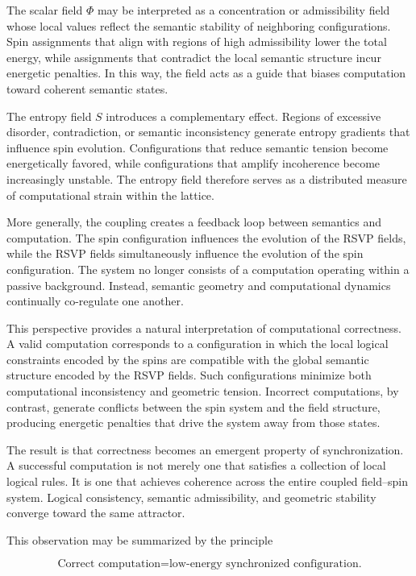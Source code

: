 \documentclass[12pt,letterpaper]{article}
\theoremstyle{remark}
\begin{document}
The scalar field $\Phi$ may be interpreted as a concentration or admissibility field whose local values reflect the semantic stability of neighboring configurations. Spin assignments that align with regions of high admissibility lower the total energy, while assignments that contradict the local semantic structure incur energetic penalties. In this way, the field acts as a guide that biases computation toward coherent semantic states.

The entropy field $S$ introduces a complementary effect. Regions of excessive disorder, contradiction, or semantic inconsistency generate entropy gradients that influence spin evolution. Configurations that reduce semantic tension become energetically favored, while configurations that amplify incoherence become increasingly unstable. The entropy field therefore serves as a distributed measure of computational strain within the lattice.

More generally, the coupling creates a feedback loop between semantics and computation. The spin configuration influences the evolution of the RSVP fields, while the RSVP fields simultaneously influence the evolution of the spin configuration. The system no longer consists of a computation operating within a passive background. Instead, semantic geometry and computational dynamics continually co-regulate one another.

This perspective provides a natural interpretation of computational correctness. A valid computation corresponds to a configuration in which the local logical constraints encoded by the spins are compatible with the global semantic structure encoded by the RSVP fields. Such configurations minimize both computational inconsistency and geometric tension. Incorrect computations, by contrast, generate conflicts between the spin system and the field structure, producing energetic penalties that drive the system away from those states.

The result is that correctness becomes an emergent property of synchronization. A successful computation is not merely one that satisfies a collection of local logical rules. It is one that achieves coherence across the entire coupled field--spin system. Logical consistency, semantic admissibility, and geometric stability converge toward the same attractor.

This observation may be summarized by the principle

\[
\boxed{
\text{Correct computation}
=
\text{low-energy synchronized configuration.}
}
\]
\end{document}
